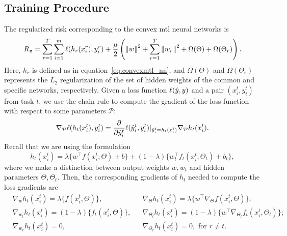 \subsection{Training Procedure}
The regularized risk corresponding to the convex \acrshort{mtl} neural networks is
\begin{equation}
    \label{eq:regrisk_convex_nn}
    \begin{aligned}
        \risk_{\bsample} = \sum_{r=1}^\ntasks \sum_{i=1}^{m} \lossf(h_r(x_i^r), y_i^r) + \frac{\mu}{2} \left( \norm{w}^2 + \sum_{r=1}^\ntasks \norm{w_r}^2 + \Omega(\Theta) + \Omega(\Theta_r)\right) .
    \end{aligned}
\end{equation}
Here, $h_r$ is defined as in equation~\eqref{eq:convexmtl_nn}, and $\Omega(\Theta)$ and $\Omega(\Theta_r)$ represents the $L_2$ regularization of the set of hidden weights of the common and specific networks, respectively.
Given a loss function $\ell(\hat{y}, y)$ and a pair $(x_i^t, y_i^t)$ from task $t$, we use the chain rule to compute the gradient of the loss function with respect to some parameters $\mathcal{P}$:
\begin{equation}\label{eq:gradient_p}
    \nabla_\mathcal{P} \lossf(h_t(x_i^t), y_i^t) = 
    \frac{\partial}{\partial \hat{y}_i^t} \lossf(\hat{y}_i^t, y_i^t) \vert_{\hat{y}_i^t = h_t(x_i^t)} \nabla_\mathcal{P} h_t(x_i^t) .
\end{equation}
Recall that we are using the formulation 
$$h_t(x_i^t)
= \lambda \lbrace w^\intercal f(x_i^t; \Theta) + b \rbrace + (1 - \lambda) \lbrace w_t^\intercal f_t(x_i^t; \Theta_t) + b_t \rbrace, $$
where we make a distinction between output weights $w, w_t$ and hidden parameters $\Theta, \Theta_t$.
Then, the corresponding gradients of $h_t$ needed to compute the loss gradients are
\begin{equation}\label{eq:gradients_losses} 
    \begin{aligned}       
        &\nabla_{w} h_t(x_i^t)  
        = \lambda \lbrace f(x_i^t, \Theta) \rbrace ,
        &&\nabla_{\Theta} h_t(x_i^t)  
        = \lambda \lbrace w^\intercal \nabla_\Theta f(x_i^t, \Theta)\rbrace ; \\
        &\nabla_{w_t} h_t(x_i^t)  
        = (1 - \lambda) \lbrace f_t(x_i^t, \Theta) \rbrace ,
        &&\nabla_{\Theta_t} h_t(x_i^t)  
        = (1 - \lambda) \lbrace  w^\intercal \nabla_{\Theta_t} f_t(x_i^t, \Theta_t)\rbrace ; \\
        &\nabla_{w_r} h_t(x_i^t)  
        =  0 , 
        &&\nabla_{\Theta_r} h_t(x_i^t)  
        =  0 , \text{ for } r \neq t .\\
    \end{aligned}    
\end{equation}
